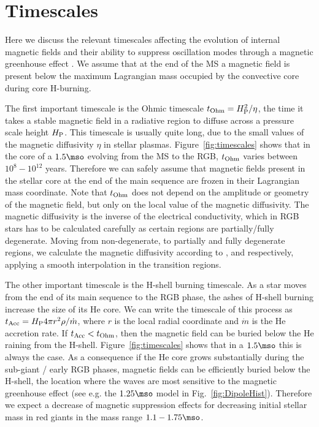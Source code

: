 \section{Timescales}
\label{time}

Here we discuss the relevant timescales affecting the evolution of internal magnetic fields and their ability to 
suppress oscillation modes through a magnetic greenhouse effect \citep{Fuller_2015}.
We assume that at the end of the MS a magnetic field is present below the maximum Lagrangian mass occupied by the convective core during core H-burning.

The first important timescale is the Ohmic timescale $t_{\rm Ohm}= H_{\rm P}^2/\eta$, the time it takes a stable magnetic field in a radiative region to diffuse across a pressure scale height $H_{\rm P}$. This timescale is usually quite long, due to the small values of the magnetic diffusivity $\eta$ in stellar plasmas. Figure~\ref{fig:timescales} shows that in the core of a $1.5\mso$ evolving from the MS to the RGB, $t_{\rm Ohm}$ varies between $10^8-10^{12}$ years. Therefore we can safely assume that magnetic fields present in the stellar core at the end of the main sequence are frozen in their Lagrangian mass coordinate.
Note that  $t_{\rm Ohm}$ does not depend on the amplitude or geometry of the magnetic field, but only on the local value of the magnetic diffusivity. The magnetic diffusivity is the inverse of the electrical conductivity,  which in RGB stars has to be calculated carefully as certain regions are partially/fully degenerate. Moving from non-degenerate, to partially and fully degenerate regions, we calculate the magnetic diffusivity according to ,  and  respectively, applying a smooth interpolation in the transition regions.

The other important timescale is the H-shell burning timescale. As a star moves from the end of its main sequence to the RGB phase, the ashes of H-shell burning increase the size of its He core. We can write the timescale of this process as $t_{\rm Acc} = H_{\rm P} 4\pi r^2 \rho / \dot{m}$, where $r$ is the local radial coordinate and $\dot{m}$ is the He accretion rate. If $t_{\rm Acc} < t_{\rm Ohm}$, then the magnetic field can be buried below the He raining from the H-shell. Figure~\ref{fig:timescales} shows that in a $1.5\mso$ this is always the case. As a consequence if the He core grows substantially during the sub-giant / early RGB phases, magnetic fields can be efficiently buried below the H-shell, the location where the waves are most sensitive to the magnetic greenhouse effect (see e.g. the $1.25\mso$ model in                  Fig.~\ref{fig:DipoleHist}). Therefore we expect a decrease of magnetic suppression effects for decreasing initial stellar mass in red giants in the mass range $1.1-1.75\mso$.

